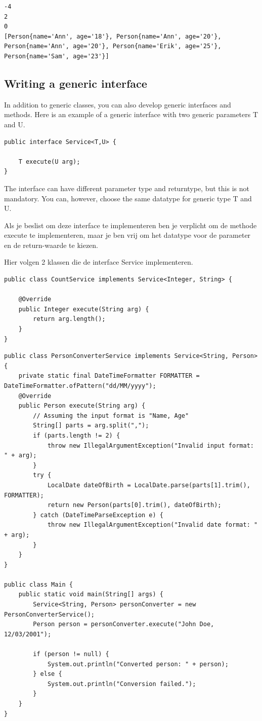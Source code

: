 \begin{verbatim}
-4
2
0
[Person{name='Ann', age='18'}, Person{name='Ann', age='20'}, Person{name='Ann', age='20'}, Person{name='Erik', age='25'}, Person{name='Sam', age='23'}]
\end{verbatim}



\subsection{Writing a generic interface}

In addition to generic classes, you can also develop generic interfaces and methods. Here is an example of a generic interface with two generic parameters T and U.

\begin{lstlisting}
public interface Service<T,U> {

	T execute(U arg);
}
\end{lstlisting}

The interface can have different parameter type and returntype, but this is not mandatory. You can, however, choose the same datatype for generic type T and U.

Als je beslist om deze interface te implementeren ben je verplicht om de methode execute te implementeren, maar je ben vrij om het datatype voor de parameter en de return-waarde te kiezen.

Hier volgen 2 klassen die de interface Service implementeren.

\begin{lstlisting}
public class CountService implements Service<Integer, String> {

	@Override
	public Integer execute(String arg) {
		return arg.length();
	}
}
\end{lstlisting}

\begin{lstlisting}
public class PersonConverterService implements Service<String, Person> {
    private static final DateTimeFormatter FORMATTER = DateTimeFormatter.ofPattern("dd/MM/yyyy");
    @Override
    public Person execute(String arg) {
        // Assuming the input format is "Name, Age"
        String[] parts = arg.split(",");
        if (parts.length != 2) {
            throw new IllegalArgumentException("Invalid input format: " + arg);
        }
        try {
            LocalDate dateOfBirth = LocalDate.parse(parts[1].trim(), FORMATTER);
            return new Person(parts[0].trim(), dateOfBirth);
        } catch (DateTimeParseException e) {
            throw new IllegalArgumentException("Invalid date format: " + arg);
        }
    }
}

public class Main {
    public static void main(String[] args) {
        Service<String, Person> personConverter = new PersonConverterService();
        Person person = personConverter.execute("John Doe, 12/03/2001");

        if (person != null) {
            System.out.println("Converted person: " + person);
        } else {
            System.out.println("Conversion failed.");
        }
    }
}
\end{lstlisting}

